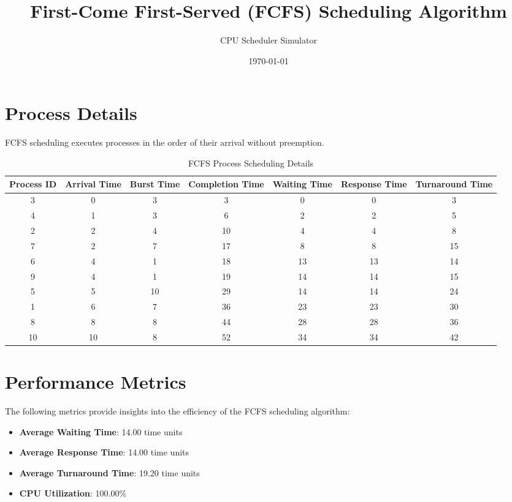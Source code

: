 \documentclass{article}
\title{\Large\textbf{First-Come First-Served (FCFS) Scheduling Algorithm}}
\author{CPU Scheduler Simulator}
\date{\today}
\begin{document}
\maketitle

\section{Process Details}
FCFS scheduling executes processes in the order of their arrival without preemption.

\begin{table}[h]
\centering
\caption{FCFS Process Scheduling Details}
\label{tab:fcfs_processes}
\begin{tabular}{|c|c|c|c|c|c|c|}
\hline
\textbf{Process ID} & \textbf{Arrival Time} & \textbf{Burst Time} & \textbf{Completion Time} & \textbf{Waiting Time} & \textbf{Response Time} & \textbf{Turnaround Time} \\
\hline
3 & 0 & 3 & 3 & 0 & 0 & 3 \\
\hline
4 & 1 & 3 & 6 & 2 & 2 & 5 \\
\hline
2 & 2 & 4 & 10 & 4 & 4 & 8 \\
\hline
7 & 2 & 7 & 17 & 8 & 8 & 15 \\
\hline
6 & 4 & 1 & 18 & 13 & 13 & 14 \\
\hline
9 & 4 & 1 & 19 & 14 & 14 & 15 \\
\hline
5 & 5 & 10 & 29 & 14 & 14 & 24 \\
\hline
1 & 6 & 7 & 36 & 23 & 23 & 30 \\
\hline
8 & 8 & 8 & 44 & 28 & 28 & 36 \\
\hline
10 & 10 & 8 & 52 & 34 & 34 & 42 \\
\hline
\end{tabular}
\end{table}

\section{Performance Metrics}
The following metrics provide insights into the efficiency of the FCFS scheduling algorithm:

\begin{itemize}
  \item \textbf{Average Waiting Time}: 14.00 time units
  \item \textbf{Average Response Time}: 14.00 time units
  \item \textbf{Average Turnaround Time}: 19.20 time units
  \item \textbf{CPU Utilization}: 100.00\%
\end{itemize}
\end{document}
